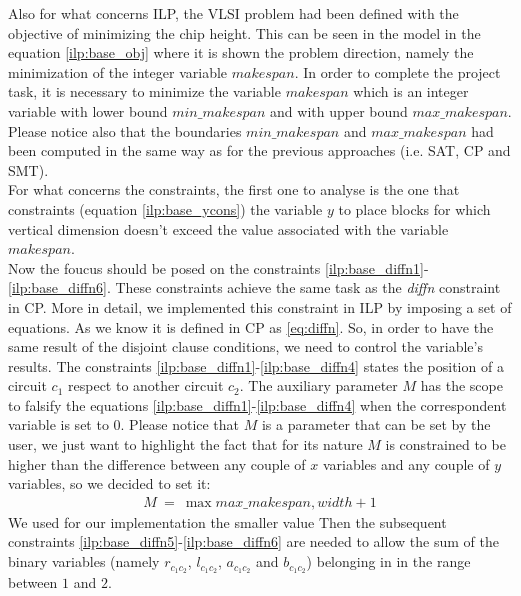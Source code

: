     Also for what concerns ILP, the VLSI problem had been defined with the objective of minimizing 
    the chip height. This can be seen in the model in the equation \ref{ilp:base_obj} where it is
    shown the problem direction, namely the minimization of the integer variable \(makespan\).
    In order to complete the project task, it is necessary to minimize the variable \(makespan\) which
    is an integer variable with lower bound \(min\_makespan\) and with upper bound \(max\_makespan\).
    Please notice also that the boundaries \(min\_makespan\) and \(max\_makespan\) had been computed
    in the same way as for the previous approaches (i.e. SAT, CP and SMT).\\

    For what concerns the constraints, the first one to analyse is the one that constraints
    (equation \ref{ilp:base_ycons}) the variable \(y\) to place blocks for which vertical dimension
    doesn't exceed the value associated with the variable \(makespan\).\\

    Now the foucus should be posed on the constraints \ref{ilp:base_diffn1}-\ref{ilp:base_diffn6}.
    These constraints achieve the same task as the \textit{diffn} constraint in CP. More in
    detail, we implemented this constraint in ILP by imposing a set of equations. As we know
    it is defined in CP as \ref{eq:diffn}. So, in order to have the same result of the disjoint
    clause conditions, we need to control the variable's results. The constraints 
    \ref{ilp:base_diffn1}-\ref{ilp:base_diffn4} states the position of a circuit \(c_1\) respect to
    another circuit \(c_2\). The auxiliary parameter \(M\) has the scope to falsify the equations 
    \ref{ilp:base_diffn1}-\ref{ilp:base_diffn4}
    when the correspondent variable is set to 0. Please notice that \(M\) is a parameter that can
    be set by the user, we just want to highlight the fact that for its nature \(M\) is constrained
    to be higher than the difference between any couple of \(x\) variables and any couple of \(y\)
    variables, so we decided to set it:
    \begin{align*}
        M\ =\ \max{max\_makespan, width} + 1 
    \end{align*}
    We used for our implementation the smaller value Then the subsequent constraints 
    \ref{ilp:base_diffn5}-\ref{ilp:base_diffn6} are needed to allow the sum of the binary variables 
    (namely \(r_{c_1c_2}\), \(l_{c_1c_2}\), \(a_{c_1c_2}\) and \(b_{c_1c_2}\)) belonging in in the range
    between \(1\) and \(2\). \\
    
